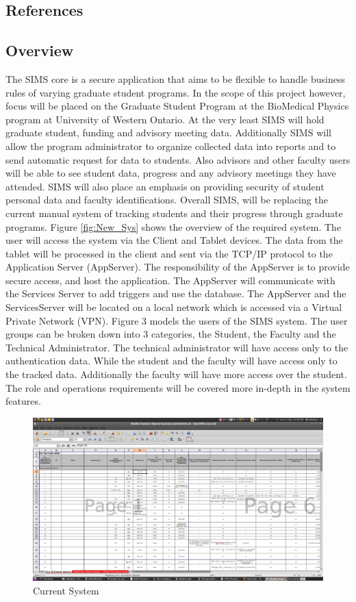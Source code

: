 \documentclass[11pt,a4paper]{report}
\begin{document}
\subsection{ References }
\subsection{ Overview }
The SIMS core is a secure application that aims to be flexible to handle business rules of varying graduate
student programs. In the scope of this project however, focus will be placed on the Graduate Student
Program at the BioMedical Physics program at University of Western Ontario. At the very least SIMS
will hold graduate student, funding and advisory meeting data. Additionally SIMS will allow the program
administrator to organize collected data into reports and to send automatic request for data to students.
Also advisors and other faculty users will be able to see student data, progress and any advisory meetings
they have attended. SIMS will also place an emphasis on providing security of student personal data and
faculty identifications. Overall SIMS, will be replacing the current manual system of tracking students and
their progress through graduate programs.
Figure \ref{fig:New_Sys} shows the overview of the required system. The user will access the system via the Client and
Tablet devices. The data from the tablet will be processed in the client and sent via the TCP/IP protocol
to the Application Server (AppServer). The responsibility of the AppServer is to provide secure access, and
host the application. The AppServer will communicate with the Services Server to add triggers and use the
database. The AppServer and the ServicesServer will be located on a local network which is accessed via
a Virtual Private Network (VPN). Figure 3 models the users of the SIMS system. The user groups can be
broken down into 3 categories, the Student, the Faculty and the Technical Administrator. The technical
administrator will have access only to the authentication data. While the student and the faculty will have
access only to the tracked data. Additionally the faculty will have more access over the student. The role
and operations requirements will be covered more in-depth in the system features.
\begin{figure}[htp]
\centering
\includegraphics[scale=0.25]{diagrams/Current_System.png}
\caption{Current System}
\label{fig:Curr_Sys}
\end{figure}
\end{document}
